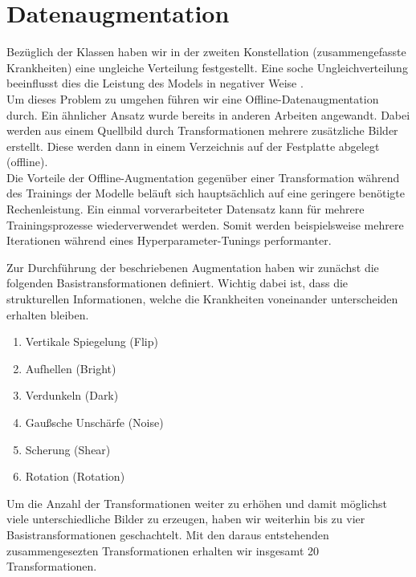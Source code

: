 \section{Datenaugmentation}

Bezüglich der Klassen haben wir in der zweiten Konstellation (zusammengefasste Krankheiten) eine ungleiche Verteilung festgestellt. Eine soche Ungleichverteilung beeinflusst dies die Leistung des Models in negativer Weise \cite{BUDA2018249}.\\
Um dieses Problem zu umgehen führen wir eine Offline-Datenaugmentation durch. Ein ähnlicher Ansatz wurde bereits in anderen Arbeiten \cite{UCAR2020109761} angewandt. Dabei werden aus einem Quellbild durch Transformationen mehrere zusätzliche Bilder erstellt. Diese werden dann in einem Verzeichnis auf der Festplatte abgelegt (offline).\\
Die Vorteile der Offline-Augmentation gegenüber einer Transformation während des Trainings der Modelle beläuft sich hauptsächlich auf eine geringere benötigte Rechenleistung. Ein einmal vorverarbeiteter Datensatz kann für mehrere Trainingsprozesse wiederverwendet werden.
Somit werden beispielsweise mehrere Iterationen während eines Hyperparameter-Tunings performanter.

\pagebreak

Zur Durchführung der beschriebenen Augmentation haben wir zunächst die folgenden Basistransformationen definiert.
Wichtig dabei ist, dass die strukturellen Informationen, welche die Krankheiten voneinander unterscheiden erhalten bleiben.
\begin{enumerate}[noitemsep]
	\item{Vertikale Spiegelung (Flip)}
	\item{Aufhellen (Bright)}
	\item{Verdunkeln (Dark)}
	\item{Gaußsche Unschärfe (Noise)}
	\item{Scherung (Shear)}
	\item{Rotation (Rotation)}
\end{enumerate}
Um die Anzahl der Transformationen weiter zu erhöhen und damit möglichst viele unterschiedliche Bilder zu erzeugen, haben wir weiterhin bis zu vier Basistransformationen geschachtelt.
Mit den daraus entstehenden zusammengesezten Transformationen erhalten wir insgesamt 20 Transformationen.

